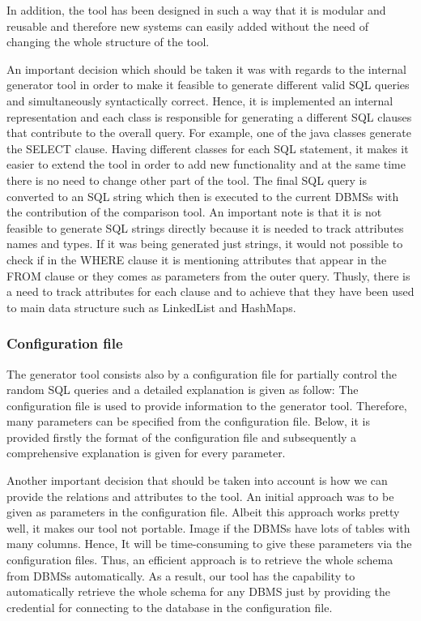 In addition, the tool has been designed in such a way that it is modular and reusable and therefore new systems can easily added without the need of changing the whole structure of the tool.

An important decision which should be taken it was with regards to the internal generator tool in order to make it feasible to generate different valid SQL queries and simultaneously syntactically correct. Hence, it is implemented an internal representation and each class is responsible for generating a different SQL clauses that contribute to the overall query. For example, one of the java classes generate the SELECT clause. Having different classes for each SQL statement, it makes it easier to extend the tool in order to add new functionality and at the same time there is no need to change other part of the tool. The final SQL query is converted to an SQL string which then is executed to the current DBMSs with the contribution of the comparison tool. An important note is that it is not feasible to generate SQL strings directly because it is needed to track attributes names and types. If it was being generated just strings, it would not possible to check if in the WHERE clause it is mentioning attributes that appear in the FROM clause or they comes as parameters from the outer query. Thusly, there is a need to track attributes for each clause and to achieve that they have been used to main data structure such as LinkedList and HashMaps.

\subsubsection{Configuration file}
The generator tool consists also by a configuration file for partially control the random SQL queries and a detailed explanation is given as follow: The configuration file is used to provide information to the generator tool. Therefore, many parameters can be specified from the configuration file. Below, it is provided firstly the format of the configuration file and subsequently a comprehensive explanation is given  for every parameter. 

Another important decision that should be taken into account is how we can provide the relations and attributes to the tool. An initial approach was to be given as parameters in the configuration file. Albeit this approach works pretty well, it makes our tool not portable. Image if the DBMSs have lots of tables with many columns. Hence, It will be time-consuming to give these parameters via the configuration files. Thus, an efficient approach is to retrieve the whole schema from DBMSs automatically. As a result, our tool has the capability to automatically retrieve the whole schema for any DBMS just by providing the credential for connecting to the database in the configuration file.   

